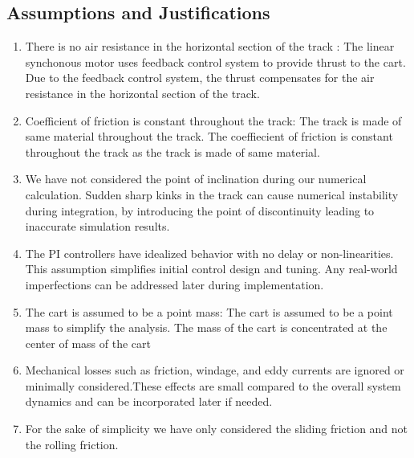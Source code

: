 \documentclass{article}
\begin{document}
    \subsection{Assumptions and Justifications}
    \begin{enumerate}
        \item There is no air resistance in the horizontal section of the track :
            The linear synchonous motor uses feedback control system to provide thrust
            to the cart. Due to the feedback control system, the thrust compensates
            for the air resistance in the horizontal section of the track.

        \item Coefficient of friction is constant throughout the track: The
            track is made of same material throughout the track. The coeffiecient
            of friction is constant throughout the track as the track is made of
            same material.

        \item We have not considered the point of inclination during our numerical
            calculation. Sudden sharp kinks in the track can cause numerical
            instability during integration, by introducing the point of discontinuity
            leading to inaccurate simulation results.

        \item The PI controllers have idealized behavior with no delay or non-linearities.
            This assumption simplifies initial control design and tuning. Any real-world
            imperfections can be addressed later during implementation.

        \item The cart is assumed to be a point mass: The cart is assumed to be
            a point mass to simplify the analysis. The mass of the cart is concentrated
            at the center of mass of the cart

        \item Mechanical losses such as friction, windage, and eddy currents are
            ignored or minimally considered.These effects are small compared to the
            overall system dynamics and can be incorporated later if needed.

        \item For the sake of simplicity we have only considered the sliding friction
            and not the rolling friction.
    \end{enumerate}
\end{document}
